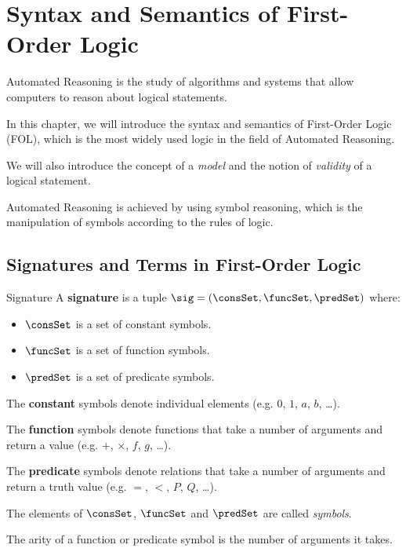 \chapter{Syntax and Semantics of First-Order Logic}
\label{ch:Syntax and Semantics of First-Order Logic}

Automated Reasoning is the study of algorithms and systems that allow computers to reason about 
logical statements. 

In this chapter, we will introduce the syntax and semantics of First-Order Logic (FOL), 
which is the most widely used logic in the field of Automated Reasoning. 

We will also introduce the concept of a \textit{model} and 
the notion of \textit{validity} of a logical statement.

Automated Reasoning is achieved by using symbol reasoning, which is the manipulation of symbols
according to the rules of logic.

\section{Signatures and Terms in First-Order Logic}
\label{sec:Signatures and Terms in First-Order Logic}

\begin{definition}{Signature}
    A \textbf{signature} is a tuple $\sig = (\consSet,\funcSet,\predSet)$ where:
    \begin{itemize}
        \item $\consSet$ is a set of constant symbols.
        \item $\funcSet$ is a set of function symbols.
        \item $\predSet$ is a set of predicate symbols.
    \end{itemize}
\end{definition}

The \textbf{constant} symbols denote individual elements (e.g. $0$, $1$, $a$, $b$, \dots).

The \textbf{function} symbols denote functions that take a number of arguments 
and return a value (e.g. $+$, $\times$, $f$, $g$, \dots).

The \textbf{predicate} symbols denote relations that take a number of arguments
and return a truth value (e.g. $=$, $<$, $P$, $Q$, \dots).

The elements of $\consSet$, $\funcSet$ and $\predSet$ are called \textit{symbols}.

The arity of a function or predicate symbol is the number of arguments it takes.

